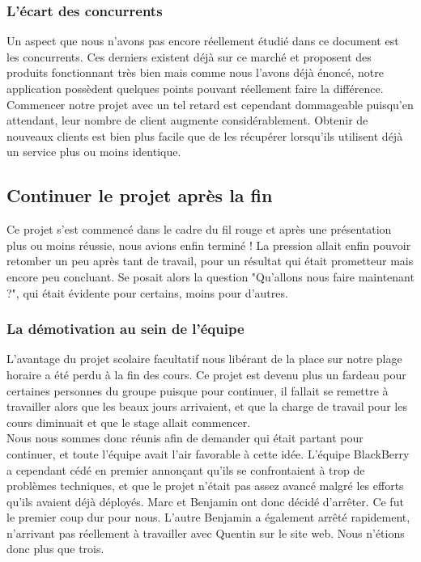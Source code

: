 \documentclass{article}
\begin{document}
		\subsubsection{L'écart des concurrents}
		Un aspect que nous n'avons pas encore réellement étudié dans ce document est les concurrents. Ces derniers existent déjà sur ce marché et proposent des produits fonctionnant très bien mais comme nous l'avons déjà énoncé, notre application possèdent quelques points pouvant réellement faire la différence.\\
		
		Commencer notre projet avec un tel retard est cependant dommageable puisqu'en attendant, leur nombre de client augmente considérablement. Obtenir de nouveaux clients est bien plus facile que de les récupérer lorsqu'ils utilisent déjà un service plus ou moins identique.
		
	\subsection{Continuer le projet après la fin}
	Ce projet s'est commencé dans le cadre du fil rouge et après une présentation plus ou moins réussie, nous avions enfin terminé ! La pression allait enfin pouvoir retomber un peu après tant de travail, pour un résultat qui était prometteur mais encore peu concluant. Se posait alors la question "Qu'allons nous faire maintenant ?", qui était évidente pour certains, moins pour d'autres.


		\subsubsection{La démotivation au sein de l'équipe}
		L'avantage du projet scolaire facultatif nous libérant de la place sur notre plage horaire a été perdu à la fin des cours. Ce projet est devenu plus un fardeau pour certaines personnes du groupe puisque pour continuer, il fallait se remettre à travailler alors que les beaux jours arrivaient, et que la charge de travail pour les cours diminuait et que le stage allait commencer. \\
		
		Nous nous sommes donc réunis afin de demander qui était partant pour continuer, et toute l'équipe avait l'air favorable à cette idée. L'équipe BlackBerry a cependant cédé en premier annonçant qu'ils se confrontaient à trop de problèmes techniques, et que le projet n'était pas assez avancé malgré les efforts qu'ils avaient déjà déployés. Marc et Benjamin ont donc décidé d'arrêter. Ce fut le premier coup dur pour nous. L'autre Benjamin a également arrêté rapidement, n'arrivant pas réellement à travailler avec Quentin sur le site web. Nous n'étions donc plus que trois. \\
		
\end{document}

